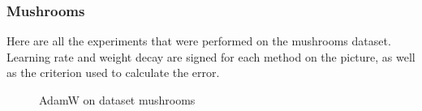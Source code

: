 \documentclass{article}
\begin{document}
\subsubsection{Mushrooms}
Here are all the experiments that were performed on the mushrooms dataset. Learning rate and weight decay are signed for each method on the picture, as well as the criterion used to calculate the error.
\begin{figure}[h]
\begin{minipage}[h]{0.5\linewidth}
\end{minipage}
\hfill
\begin{minipage}[h]{0.5\linewidth}
\end{minipage}
\caption{AdamW on dataset mushrooms}

\label{fig:m_adamw}
\end{figure}
\end{document}
